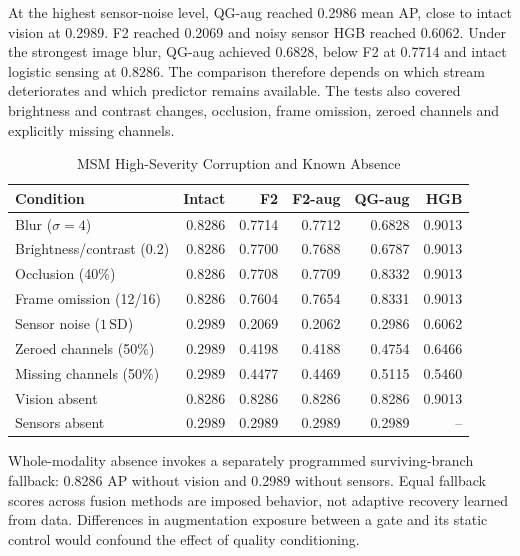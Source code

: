 At the highest sensor-noise level, QG-aug reached 0.2986 mean AP, close to intact
vision at 0.2989. F2 reached 0.2069 and noisy sensor HGB reached 0.6062. Under the
strongest image blur, QG-aug achieved 0.6828, below F2 at 0.7714 and intact logistic
sensing at 0.8286. The comparison therefore depends on which stream deteriorates and
which predictor remains available. The tests also covered brightness and contrast
changes, occlusion, frame omission, zeroed channels and explicitly missing channels.


\begin{table}[htbp]
\caption{MSM High-Severity Corruption and Known Absence}\label{tab:msm-robustness}
\centering\small\setlength{\tabcolsep}{4pt}
\begin{tabular}{lrrrrr}\toprule
Condition & Intact & F2 & F2-aug & QG-aug & HGB\\\midrule
Blur ($\sigma=4$) & 0.8286 & 0.7714 & 0.7712 & 0.6828 & 0.9013\\
Brightness/contrast (0.2) & 0.8286 & 0.7700 & 0.7688 & 0.6787 & 0.9013\\
Occlusion (40\%) & 0.8286 & 0.7708 & 0.7709 & 0.8332 & 0.9013\\
Frame omission (12/16) & 0.8286 & 0.7604 & 0.7654 & 0.8331 & 0.9013\\
Sensor noise ($1\,\mathrm{SD}$) & 0.2989 & 0.2069 & 0.2062 & 0.2986 & 0.6062\\
Zeroed channels (50\%) & 0.2989 & 0.4198 & 0.4188 & 0.4754 & 0.6466\\
Missing channels (50\%) & 0.2989 & 0.4477 & 0.4469 & 0.5115 & 0.5460\\
Vision absent & 0.8286 & 0.8286 & 0.8286 & 0.8286 & 0.9013\\
Sensors absent & 0.2989 & 0.2989 & 0.2989 & 0.2989 & --\\
\bottomrule\end{tabular}
\end{table}

Whole-modality absence invokes a separately programmed surviving-branch fallback:
0.8286 AP without vision and 0.2989 without sensors. Equal fallback scores across
fusion methods are imposed behavior, not adaptive recovery learned from data.
Differences in augmentation exposure between a gate and its static control would
confound the effect of quality conditioning.

